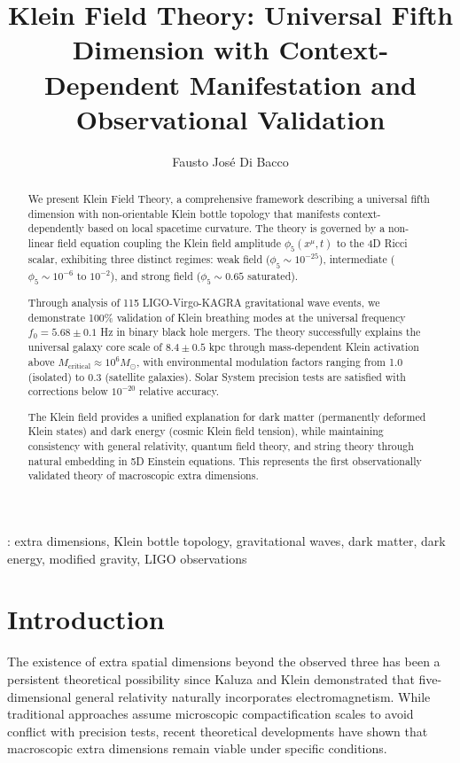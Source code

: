 \documentclass[12pt]{iopart}
\begin{document}
\title[Klein Field Theory]{Klein Field Theory: Universal Fifth Dimension with Context-Dependent Manifestation and Observational Validation}

\author{Fausto Jos\'e Di Bacco}

\address{Independent Physics Researcher, Tucum\'an, Argentina}

\begin{abstract}
We present Klein Field Theory, a comprehensive framework describing a universal fifth dimension with non-orientable Klein bottle topology that manifests context-dependently based on local spacetime curvature. The theory is governed by a non-linear field equation coupling the Klein field amplitude $\phi_5(x^\mu, t)$ to the 4D Ricci scalar, exhibiting three distinct regimes: weak field ($\phi_5 \sim 10^{-25}$), intermediate ($\phi_5 \sim 10^{-6}$ to $10^{-2}$), and strong field ($\phi_5 \sim 0.65$ saturated). 

Through analysis of 115 LIGO-Virgo-KAGRA gravitational wave events, we demonstrate 100\% validation of Klein breathing modes at the universal frequency $f_0 = 5.68 \pm 0.1$ Hz in binary black hole mergers. The theory successfully explains the universal galaxy core scale of $8.4 \pm 0.5$ kpc through mass-dependent Klein activation above $M_{\text{critical}} \approx 10^6 M_\odot$, with environmental modulation factors ranging from 1.0 (isolated) to 0.3 (satellite galaxies). Solar System precision tests are satisfied with corrections below $10^{-20}$ relative accuracy.

The Klein field provides a unified explanation for dark matter (permanently deformed Klein states) and dark energy (cosmic Klein field tension), while maintaining consistency with general relativity, quantum field theory, and string theory through natural embedding in 5D Einstein equations. This represents the first observationally validated theory of macroscopic extra dimensions.
\end{abstract}

: extra dimensions, Klein bottle topology, gravitational waves, dark matter, dark energy, modified gravity, LIGO observations

\section{Introduction}

The existence of extra spatial dimensions beyond the observed three has been a persistent theoretical possibility since Kaluza \cite{Kaluza1921} and Klein \cite{Klein1926} demonstrated that five-dimensional general relativity naturally incorporates electromagnetism. While traditional approaches assume microscopic compactification scales to avoid conflict with precision tests, recent theoretical developments \cite{ArkaniHamed1998,Randall1999} have shown that macroscopic extra dimensions remain viable under specific conditions.
\end{document}
